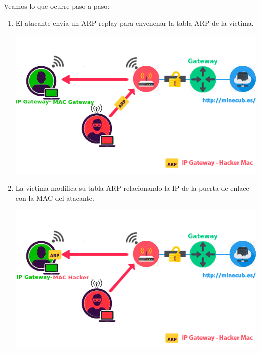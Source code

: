 Veamos lo que ocurre paso a paso:
\begin{enumerate}
	\item El atacante envía un ARP replay para envenenar la tabla ARP de la víctima.
	\begin{center}
		\includegraphics[scale=0.7]{ARPpoison1.png}
	\end{center}
\newpage
	\item La víctima modifica su tabla ARP relacionando la IP de la puerta de enlace con la MAC del atacante.
	\begin{center}
		\includegraphics[scale=0.7]{ARPpoison2.png}
	\end{center}
\end{enumerate}

